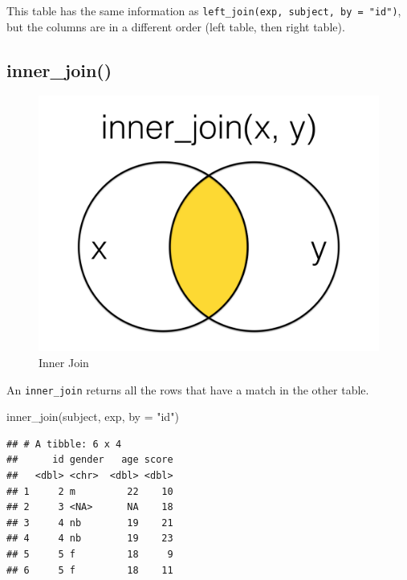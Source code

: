 \documentclass[
  oneside]{book}
\newenvironment{Shaded}{\begin{snugshade}}{\end{snugshade}}
\newcommand{\AttributeTok}[1]{\textcolor[rgb]{0.77,0.63,0.00}{#1}}
\newcommand{\FunctionTok}[1]{\textcolor[rgb]{0.00,0.00,0.00}{#1}}
\newcommand{\NormalTok}[1]{#1}
\newcommand{\StringTok}[1]{\textcolor[rgb]{0.31,0.60,0.02}{#1}}
\begin{document}
\begin{info}
This table has the same information as \texttt{left\_join(exp,\ subject,\ by\ =\ "id")}, but the columns are in a different order (left table, then right table).

\end{info}

\hypertarget{inner_join}{%
\subsection{inner\_join()}\label{inner_join}}

\begin{figure}

{\centering \includegraphics[width=1\linewidth]{images/joins/inner_join} 

}

\caption{Inner Join}\label{fig:img-inner-join}
\end{figure}

An \texttt{inner\_join} returns all the rows that have a match in the other table.

\begin{Shaded}
\begin{Highlighting}[]
\FunctionTok{inner\_join}\NormalTok{(subject, exp, }\AttributeTok{by =} \StringTok{"id"}\NormalTok{)}
\end{Highlighting}
\end{Shaded}

\begin{verbatim}
## # A tibble: 6 x 4
##      id gender   age score
##   <dbl> <chr>  <dbl> <dbl>
## 1     2 m         22    10
## 2     3 <NA>      NA    18
## 3     4 nb        19    21
## 4     4 nb        19    23
## 5     5 f         18     9
## 6     5 f         18    11
\end{verbatim}
\end{document}
